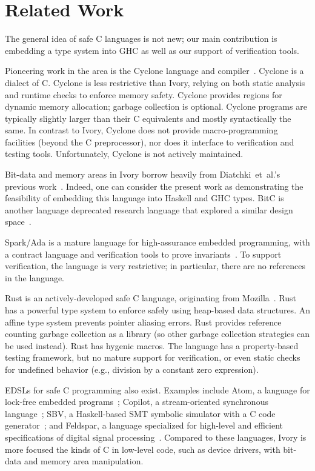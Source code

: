 \section{Related Work}
\label{sec:related-work}

The general idea of safe C languages is not new; our main contribution is
embedding a type system into GHC as well as our support of verification
tools.

Pioneering work in the area is the Cyclone language and
compiler~\cite{cyclone}. Cyclone is a dialect of C. Cyclone is less restrictive than
Ivory, relying on both static analysis and runtime checks to enforce memory
safety. Cyclone provides regions for dynamic memory allocation; garbage
collection is optional. Cyclone programs are typically slightly larger than
their C equivalents and mostly syntactically the same. In contrast to Ivory,
Cyclone does not provide macro-programming facilities (beyond the C
preprocessor), nor does it interface to verification and testing
tools. Unfortunately, Cyclone is not actively maintained.

Bit-data and memory areas in Ivory borrow heavily from Diatchki~et~al.'s
previous work~\cite{high-level, memareas}. Indeed, one can consider the present
work as demonstrating the feasibility of embedding this language into Haskell
and GHC types. BitC is another language deprecated research language that
explored a similar design space~\cite{bitc}.

Spark/Ada is a mature language for high-assurance embedded
programming, with a contract language and verification tools to
prove invariants~\cite{spark}. To support verification, the language is
very restrictive; in particular, there are no references in the language.

Rust is an actively-developed safe C language, originating from
Mozilla~\cite{rust}. Rust has a powerful type system to enforce safely using
heap-based data structures. An affine type system prevents pointer aliasing
errors. Rust provides reference counting garbage collection as a library (so
other garbage collection strategies can be used instead). Rust has hygenic
macros. The language has a property-based testing framework, but no mature
support for verification, or even static checks for undefined behavior (e.g.,
division by a constant zero expression).

EDSLs for safe C programming also exist. Examples include Atom, a language for
lock-free embedded programs~\cite{atom}; Copilot, a stream-oriented synchronous
language~\cite{copilot}; SBV, a Haskell-based SMT symbolic simulator with a C code
generator~\cite{sbv}; and Feldspar, a language specialized for high-level and
efficient specifications of digital signal processing~\cite{feldspar1}. Compared to these
languages, Ivory is more focused the kinds of C in low-level code, such as
device drivers, with bit-data and memory area manipulation.
